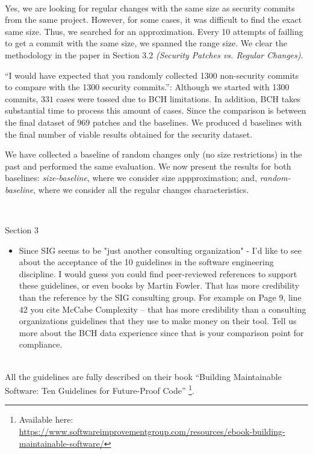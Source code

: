 \documentclass[11pt,fleqn]{article}
\newcommand{\eline}{\vspace*{.75\baselineskip}}
\newcommand{\Referee}[1]{\eline \noindent {\bf Reviewer comment #1:} \\}
\newcommand{\Us}{\eline \noindent {\bf Response:}\\}
\newenvironment{revcomment}[1][]
{\Referee{#1}\begin{rcomment}}
{\end{rcomment}}
\begin{document}
\Us Yes, we are looking for regular changes with the same size as security commits
from the same project. However, 
for some cases, it was difficult to find the exact same size. Thus, we  
searched for an approximation. Every 10 attempts of failling to get a commit with 
the same size, we spanned the range size. We clear the methodology in the paper
in Section 3.2 \textit{(Security Patches vs. Regular Changes)}.

``I would have expected that you randomly collected 1300 non-security commits to compare 
with the 1300 security commits.'': Although we started with 1300 commits, 
$331$ cases were tossed due to BCH limitations. In addition, BCH
takes substantial time to process this amount of cases. 
Since the comparison is between 
the final dataset of $969$ patches and the baselines. We produced d
baselines with the final number of viable results obtained for the security 
dataset.

We 
have collected a baseline of random changes only (no size restrictions) in the past and 
performed the same evaluation. We now present the results for both baselines: \textit{size-baseline}, where we consider
size appproximation; and, \textit{random-baseline}, where we consider all the regular
changes characteristics.


\begin{revcomment}[2.12]
    Section 3\\
    \begin{itemize}
        \item Since SIG seems to be "just another consulting organization" - I'd like 
        to see about the acceptance of the 10 guidelines in the software engineering 
        discipline.  I would guess you could find peer-reviewed references to support 
        these guidelines, or even books by Martin Fowler.   That has more credibility 
        than the reference by the SIG consulting group. For example on Page 9, line 42 
        you cite McCabe Complexity --  that has more credibility than a consulting 
        organizations guidelines that they use to make money on their tool.  Tell us more 
        about the BCH data experience since that is your comparison point for compliance.
    \end{itemize}
\end{revcomment}

\Us All the guidelines are fully described on their book ``Building Maintainable 
Software: Ten Guidelines for Future-Proof Code''
\footnote{Available here: \url{https://www.softwareimprovementgroup.com/resources/ebook-building-maintainable-software/}}.
\end{document}
